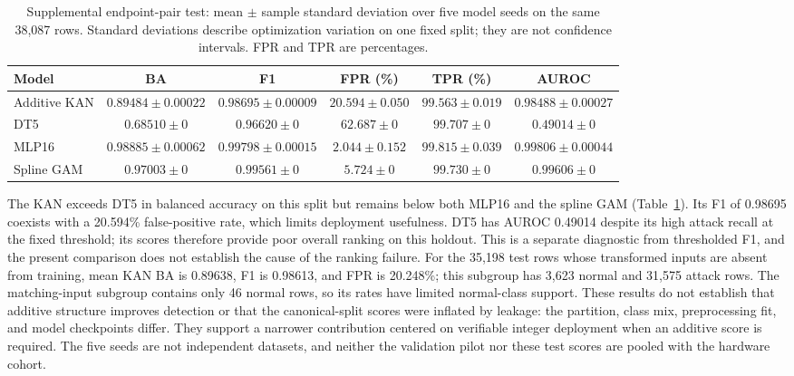 \begin{table}[t]
\centering
\caption{Supplemental endpoint-pair test: mean $\pm$ sample standard deviation
over five model seeds on the same 38,087 rows. Standard deviations describe
optimization variation on one fixed split; they are not confidence intervals.
FPR and TPR are percentages.}
\label{tab:pair-stage2}
\small
\begin{tabular}{lccccc}
\toprule
Model & BA & F1 & FPR (\%) & TPR (\%) & AUROC\\
\midrule
Additive KAN & $0.89484\pm0.00022$ & $0.98695\pm0.00009$ & $20.594\pm0.050$ & $99.563\pm0.019$ & $0.98488\pm0.00027$\\
DT5 & $0.68510\pm0$ & $0.96620\pm0$ & $62.687\pm0$ & $99.707\pm0$ & $0.49014\pm0$\\
MLP16 & $0.98885\pm0.00062$ & $0.99798\pm0.00015$ & $2.044\pm0.152$ & $99.815\pm0.039$ & $0.99806\pm0.00044$\\
Spline GAM & $0.97003\pm0$ & $0.99561\pm0$ & $5.724\pm0$ & $99.730\pm0$ & $0.99606\pm0$\\
\bottomrule
\end{tabular}
\end{table}

The KAN exceeds DT5 in balanced accuracy on this split but remains below both
MLP16 and the spline GAM (Table~\ref{tab:pair-stage2}). Its F1 of 0.98695
coexists with a 20.594\% false-positive rate, which limits deployment usefulness.
DT5 has AUROC 0.49014 despite its high attack recall at the fixed threshold;
its scores therefore provide poor overall ranking on this holdout. This is a
separate diagnostic from thresholded F1, and the present comparison does not
establish the cause of the ranking failure.
For the 35,198 test rows whose transformed inputs are absent from training,
mean KAN BA is 0.89638, F1 is 0.98613, and FPR is 20.248\%; this subgroup has
3,623 normal and 31,575 attack rows. The matching-input subgroup contains only
46 normal rows, so its rates have limited normal-class support. These results
do not establish that additive structure improves detection or that the
canonical-split scores were inflated by leakage: the partition, class mix,
preprocessing fit, and model checkpoints differ. They support a narrower
contribution centered on verifiable integer deployment when an additive score
is required. The five seeds are not independent datasets, and neither the
validation pilot nor these test scores are pooled with the hardware cohort.
